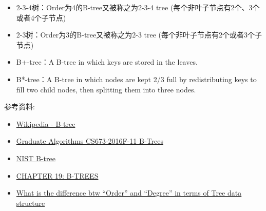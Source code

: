 \documentclass[12pt]{article}
\begin{document}
\begin{itemize}
\tightlist
\item
  2-3-4树：Order为4的B-tree又被称之为2-3-4 tree (每个非叶子节点有2个、3个或者4个子节点)
\item
  2-3树：Order为3的B-tree又被称之为2-3 tree (每个非叶子节点有2个或者3个子节点)
\item
  B+-tree：A B-tree in which keys are stored in the leaves.
\item
  B*-tree：A B-tree in which nodes are kept 2/3 full by redistributing keys to fill two child nodes, then splitting them into three nodes.
\end{itemize}

参考资料:

\begin{itemize}
\tightlist
\item
  \href{https://en.wikipedia.org/wiki/B-tree}{Wikipedia - B-tree}
\item
  \href{https://www.cs.usfca.edu/~galles/cs673/lecture/lecture11.pdf}{Graduate Algorithms CS673-2016F-11 B-Trees}
\item
  \href{https://xlinux.nist.gov/dads/HTML/btree.html}{NIST B-tree}
\item
  \href{http://staff.ustc.edu.cn/~csli/graduate/algorithms/book6/chap19.htm}{CHAPTER 19: B-TREES}
\item
  \href{https://stackoverflow.com/questions/28846377/what-is-the-difference-btw-order-and-degree-in-terms-of-tree-data-structure}{What is the difference btw ``Order'' and ``Degree'' in terms of Tree data structure}
\end{itemize}
\end{document}

